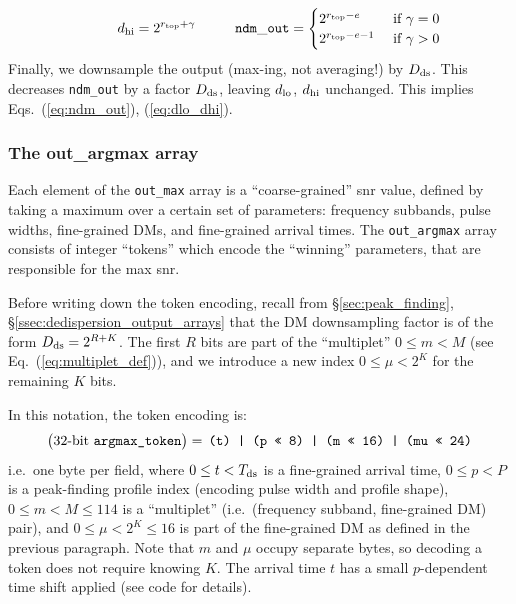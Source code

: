 \documentclass{article}
\numberwithin{equation}{section}   %
\begin{document}
\begin{itemize}
\begin{equation}
     \hspace{1cm}
   d_{\rm hi} = 2^{r_{\rm top} + \gamma}
     \hspace{1cm}
   {\tt ndm\_out} = \begin{cases}
     2^{r_{\rm top}-e} & \mbox{ if } \gamma = 0 \\
     2^{r_{\rm top}-e-1} & \mbox{ if } \gamma > 0 \\
  \end{cases}
  \end{equation}
  Finally, we downsample the output (max-ing, not averaging!) by $D_{\rm ds}$.
  This decreases {\tt ndm\_out} by a factor $D_{\rm ds}$, leaving $d_{\rm lo}$, $d_{\rm hi}$
  unchanged. This implies Eqs.\ (\ref{eq:ndm_out}), (\ref{eq:dlo_dhi}).
\end{itemize}

\subsubsection{The out\_argmax array}

Each element of the \verb|out_max| array is a ``coarse-grained'' snr value, defined by taking
a maximum over a certain set of parameters: frequency subbands, pulse widths, fine-grained DMs,
and fine-grained arrival times. The \verb|out_argmax| array consists of integer ``tokens''
which encode the ``winning'' parameters, that are responsible for the max snr.

Before writing down the token encoding, recall from \S\ref{sec:peak_finding}, \S\ref{ssec:dedispersion_output_arrays}
that the DM downsampling factor is of the form $D_{\rm ds} = 2^{R+K}$.
The first $R$ bits are part of the ``multiplet'' $0 \le m < M$ (see Eq.\ (\ref{eq:multiplet_def})),
and we introduce a new index $0\le \mu < 2^K$ for the remaining $K$ bits.

In this notation, the token encoding is:
\begin{equation}
\big(\mbox{32-bit {\tt argmax\_token}}\big)
 = \, \mbox{\tt (t) | (p << 8) | (m << 16) | (mu << 24)}
\end{equation}
i.e.~one byte per field, where $0 \le t < T_{\rm ds}$ is a fine-grained arrival time,
$0 \le p < P$ is a peak-finding profile index (encoding pulse width and profile shape),
$0 \le m < M \le 114$ is a ``multiplet'' (i.e.~(frequency subband, fine-grained DM) pair),
and $0 \le \mu < 2^K \le 16$ is part of the fine-grained DM as defined in the previous
paragraph. Note that $m$ and $\mu$ occupy separate bytes, so decoding a token does not
require knowing $K$.
The arrival time $t$ has a small $p$-dependent time shift applied (see code for details).
\end{document}
